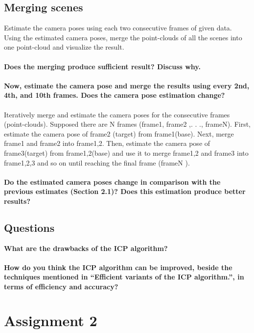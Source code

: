 \documentclass[12pt]{amsart}
\begin{document}
\subsection{Merging scenes}
Estimate the camera poses using each two consecutive frames of given data. Using the estimated camera poses, merge the point-clouds of all the scenes into one point-cloud and visualize the result. 
\\\\
\textbf{Does the merging produce sufficient result? Discuss why.}
\\\\
\textbf{Now, estimate the camera pose and merge the results using every 2nd, 4th, and 10th frames. Does the camera pose estimation change?}
\\\\
Iteratively merge and estimate the camera poses for the consecutive frames (point-clouds). Supposed there are N frames (frame1, frame2 ,. . ., frameN). First, estimate the camera pose of frame2 (target) from frame1(base). Next, merge frame1 and frame2 into frame1,2. Then, estimate the camera pose of frame3(target) from frame1,2(base) and use it to merge frame1,2 and frame3 into frame1,2,3 and so on until reaching the final frame (frameN ).\\\\ \textbf{Do the estimated camera poses change in comparison with the previous estimates (Section 2.1)? Does this estimation produce better results?}
\subsection{Questions}
\textbf{What are the drawbacks of the ICP algorithm?}\\\\
\textbf{How do you think the ICP algorithm can be improved, beside the techniques mentioned in ``Efficient variants of the ICP algorithm.'', in terms of efficiency and accuracy?}

\section{Assignment 2}
\end{document}
